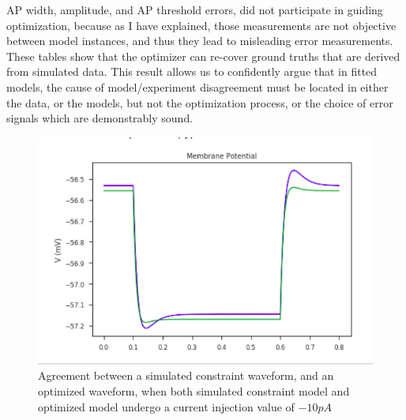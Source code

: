 \begin{table}[ht]
\centering
{}
\end{table}

AP width, amplitude, and AP threshold errors, did not participate in guiding optimization, because as I have explained, those measurements are not objective between model instances, and thus they lead to misleading error measurements. These tables show that the optimizer can re-cover ground truths that are derived from simulated data. This result allows us to confidently argue that in fitted models, the cause of model/experiment disagreement must be located in either the data, or the models, but not the optimization process, or the choice of error signals which are demonstrably sound.


\begin{figure}
    \begin{center}
    \includegraphics[scale=0.65]{figures/passive_model_agreement}
    \caption{Agreement between a simulated constraint waveform, and an optimized waveform, when both simulated constraint model and optimized model undergo a current injection value of $-10pA$}
    \end{center}
    \label{fig:my_label}
\end{figure}




